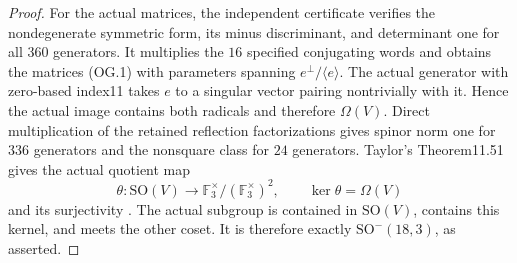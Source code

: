 \begin{proof}
For the actual matrices, the independent
certificate verifies the nondegenerate symmetric
form, its minus discriminant, and determinant
one for all \(360\) generators.
It multiplies the \(16\) specified conjugating
words and obtains the matrices (OG.1) with
parameters spanning \(e^\perp/\langle e\rangle\).
The actual generator with zero-based index11
takes \(e\) to a singular vector pairing
nontrivially with it. Hence the actual image
contains both radicals and therefore \(\Omega(V)\).
Direct multiplication of the retained reflection
factorizations gives spinor norm one for
\(336\) generators and the nonsquare class
for \(24\) generators.
Taylor's Theorem11.51 gives the actual quotient
map
\[
 \theta:\mathrm{SO}(V)\longrightarrow
 \mathbb F_3^\times/(\mathbb F_3^\times)^2,
 \qquad \ker\theta=\Omega(V)
 \tag{OG.6}
\]
and its surjectivity
\cite[p.~164]{GhostTaylorClassical}.
The actual subgroup is contained in \(\mathrm{SO}(V)\),
contains this kernel, and meets the other coset.
It is therefore exactly \(\mathrm{SO}^-(18,3)\),
as asserted.
\end{proof}

